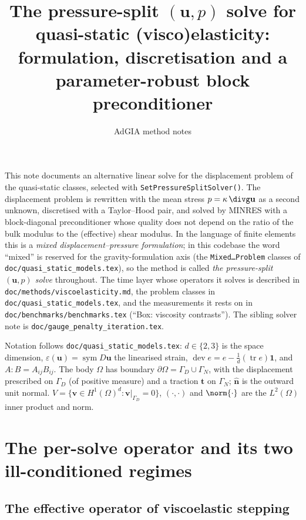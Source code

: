 \documentclass[11pt]{article}
\title{The pressure-split $(\mathbf{u}, p)$ solve for quasi-static
       (visco)elasticity:\\ formulation, discretisation and a
       parameter-robust block preconditioner}
\author{AdGIA method notes}
\date{}
\numberwithin{equation}{section}
\theoremstyle{remark}
\newcommand{\eps}{\varepsilon}
\newcommand{\tr}{\operatorname{tr}}
\newcommand{\sym}{\operatorname{sym}}
\newcommand{\dev}{\operatorname{dev}}
\newcommand{\vu}{\mathbf{u}}
\newcommand{\vv}{\mathbf{v}}
\newcommand{\vn}{\hat{\mathbf{n}}}
\newcommand{\vt}{\mathbf{t}}
\newcommand{\one}{\mathbf{1}}
\newcommand{\code}[1]{\texttt{#1}}
\begin{document}
\maketitle

\noindent
This note documents an alternative linear solve for the displacement
problem of the quasi-static classes, selected with
\code{SetPressureSplitSolver()}. The displacement problem is rewritten
with the mean stress $p = \kappa\,\divg\vu$ as a second unknown,
discretised with a Taylor--Hood pair, and solved by MINRES with a
block-diagonal preconditioner whose quality does not depend on the ratio
of the bulk modulus to the (effective) shear modulus. In the language of
finite elements this is a \emph{mixed displacement--pressure
formulation}; in this codebase the word ``mixed'' is reserved for the
gravity-formulation axis (the \code{Mixed\ldots Problem} classes of
\code{doc/quasi\_static\_models.tex}), so the method is called \emph{the
pressure-split $(\vu, p)$ solve} throughout. The time layer whose
operators it solves is described in \code{doc/methods/viscoelasticity.md}, the
problem classes in \code{doc/quasi\_static\_models.tex}, and the
measurements it rests on in \code{doc/benchmarks/benchmarks.tex} (``Box: viscosity
contrasts''). The sibling solver note is
\code{doc/gauge\_penalty\_iteration.tex}.

Notation follows \code{doc/quasi\_static\_models.tex}: $d \in \{2,3\}$
is the space dimension, $\eps(\vu) = \sym D\vu$ the linearised strain,
$\dev e = e - \frac1d (\tr e)\one$, and $A:B = A_{ij}B_{ij}$. The body
$\Omega$ has boundary $\partial\Omega = \Gamma_D \cup \Gamma_N$, with the
displacement prescribed on $\Gamma_D$ (of positive measure) and a traction
$\vt$ on $\Gamma_N$; $\vn$ is the outward unit normal. $V = \{\vv \in
H^1(\Omega)^d : \vv|_{\Gamma_D} = 0\}$, $(\cdot,\cdot)$ and
$\norm{\cdot}$ are the $L^2(\Omega)$ inner product and norm.

\tableofcontents

\section{The per-solve operator and its two ill-conditioned regimes}
\label{sec:setting}

\subsection{The effective operator of viscoelastic stepping}
\label{sec:beta}
\end{document}

